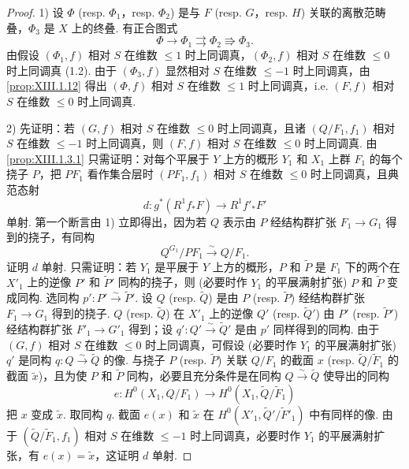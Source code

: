 \begin{proof}
1) 设 $\Phi$ (resp. $\Phi_1$，resp. $\Phi_2$) 是与 $F$ (resp. $G$，resp. $H$) 关联的离散范畴叠，$\Phi_3$ 是 $X$ 上的终叠. 有正合图式
\[
\Phi \longrightarrow \Phi_1 \rightrightarrows \Phi_2 \Rrightarrow \Phi_3.
\]
由假设 $(\Phi_1, f)$ 相对 $S$ 在维数 $\leqslant 1$ 时上同调真，$(\Phi_2, f)$ 相对 $S$ 在维数 $\leqslant 0$ 时上同调真 (1.2). 由于 $(\Phi_3, f)$ 显然相对 $S$ 在维数 $\leqslant -1$ 时上同调真，由 \ref{prop:XIII.1.12} 得出 $(\Phi, f)$ 相对 $S$ 在维数 $\leqslant 1$ 时上同调真，i.e. $(F, f)$ 相对 $S$ 在维数 $\leqslant 0$ 时上同调真.

2) 先证明：若 $(G, f)$ 相对 $S$ 在维数 $\leqslant 0$ 时上同调真，且诸 $(Q/F_1, f_1)$ 相对 $S$ 在维数 $\leqslant -1$ 时上同调真，则 $(F, f)$ 相对 $S$ 在维数 $\leqslant 0$ 时上同调真. 由 \ref{prop:XIII.1.3.1} 只需证明：对每个平展于 $Y$ 上方的概形 $Y_1$ 和 $X_1$ 上群 $F_1$ 的每个挠子 $P$，把 $P F_1$ 看作集合层时 $(P F_1, f_1)$ 相对 $S$ 在维数 $\leqslant 0$ 时上同调真，且典范态射
\[
d \colon g^{*}(R^1 f_* F) \longrightarrow R^1 f'_* F'
\]
单射. 第一个断言由 1) 立即得出，因为若 $Q$ 表示由 $P$ 经结构群扩张 $F_1 \to G_1$ 得到的挠子，有同构
\[
Q^{G_1}/P F_1 \xrightarrow{\sim} Q/F_1.
\]
证明 $d$ 单射. 只需证明：若 $Y_1$ 是平展于 $Y$ 上方的概形，$P$ 和 $\widetilde{P}$ 是 $F_1$ 下的两个在 $X'_1$ 上的逆像 $P'$ 和 $\widetilde{P}'$ 同构的挠子，则 (必要时作 $Y_1$ 的平展满射扩张) $P$ 和 $\widetilde{P}$ 变成同构. 选同构 $p' \colon P' \xrightarrow{\sim} \widetilde{P}'$. 设 $Q$ (resp. $\widetilde{Q}$) 是由 $P$ (resp. $\widetilde{P}$) 经结构群扩张 $F_1 \to G_1$ 得到的挠子. $Q$ (resp. $\widetilde{Q}$) 在 $X'_1$ 上的逆像 $Q'$ (resp. $\widetilde{Q}'$) 由 $P'$ (resp. $\widetilde{P}'$) 经结构群扩张 $F'_1 \to G'_1$ 得到；设 $q' \colon Q' \xrightarrow{\sim} \widetilde{Q}'$ 是由 $p'$ 同样得到的同构. 由于 $(G, f)$ 相对 $S$ 在维数 $\leqslant 0$ 时上同调真，可假设 (必要时作 $Y_1$ 的平展满射扩张) $q'$ 是同构 $q \colon Q \xrightarrow{\sim} \widetilde{Q}$ 的像. 与挠子 $P$ (resp. $\widetilde{P}$) 关联 $Q/F_1$ 的截面 $x$ (resp. $\widetilde{Q}/\widetilde{F}_1$ 的截面 $\widetilde{x}$)，且为使 $P$ 和 $\widetilde{P}$ 同构，必要且充分条件是在同构 $Q \xrightarrow{\sim} \widetilde{Q}$ 使导出的同构
\[
e \colon H^0(X_1, Q/F_1) \longrightarrow H^0(X_1, \widetilde{Q}/\widetilde{F}_1)
\]
把 $x$ 变成 $\widetilde{x}$. 取同构 $q$. 截面 $e(x)$ 和 $\widetilde{x}$ 在 $H^0(X'_1, \widetilde{Q}'/\widetilde{F}'_1)$ 中有同样的像. 由于 $(\widetilde{Q}/\widetilde{F}_1, f_1)$ 相对 $S$ 在维数 $\leqslant -1$ 时上同调真，必要时作 $Y_1$ 的平展满射扩张，有 $e(x) = \widetilde{x}$，这证明 $d$ 单射.


\end{proof}
